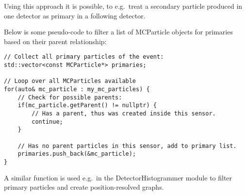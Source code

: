 \begin{description}
Using this approach it is possible, to e.g.\ treat a secondary particle produced in one detector as primary in a following detector.

Below is some pseudo-code to filter a list of MCParticle objects for primaries based on their parent relationship:

\begin{verbatim}
// Collect all primary particles of the event:
std::vector<const MCParticle*> primaries;

// Loop over all MCParticles available
for(auto& mc_particle : my_mc_particles) {
    // Check for possible parents:
    if(mc_particle.getParent() != nullptr) {
        // Has a parent, thus was created inside this sensor.
        continue;
    }

    // Has no parent particles in this sensor, add to primary list.
    primaries.push_back(&mc_particle);
}
\end{verbatim}

A similar function is used e.g.\ in the DetectorHistogrammer module to filter primary particles and create position-resolved graphs.
\end{description}

